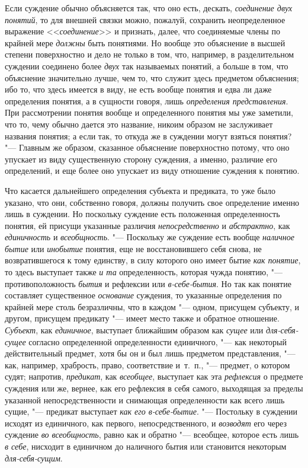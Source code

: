 {Если суждение обычно объясняется так, что оно есть, дескать,
{\em соединение двух понятий},
то для внешней связки можно, пожалуй, сохранить
неопределенное выражение
<<{\em соединение}>> и
признать, далее, что соединяемые члены по крайней мере
{\em должны} быть
понятиями. Но вообще это объяснение в высшей степени поверхностно и дело не
только в том, что, например, в разделительном суждении соединено более
{\em двух} так называемых
понятий, а больше в том, что объяснение значительно лучше, чем то, что
служит здесь предметом объяснения; ибо то, что здесь имеется в виду, не
есть вообще понятия и едва ли даже определения понятия, а в сущности
говоря, лишь {\em определения
представления}. При рассмотрении понятия вообще и
определенного понятия мы уже заметили, что то, чему обычно дается это
название, никоим образом не заслуживает названия понятия; а если так, то
откуда же в суждении могут взяться понятия? "--- Главным же
образом, сказанное объяснение поверхностно потому, что оно упускает из виду
существенную сторону суждения, а именно, различие его определений, и еще
более оно упускает из виду отношение суждения к понятию.

Что касается дальнейшего определения субъекта и предиката, то
уже было указано, что они, собственно говоря, должны получить свое
определение именно лишь в суждении. Но поскольку суждение есть положенная
определенность понятия, ей присущи указанные различия
{\em непосредственно} и
{\em абстрактно}, как
{\em единичность} и
{\em всеобщность}. "---
Поскольку же суждение есть вообще
{\em наличное бытие} или
{\em инобытие} понятия,
еще не восстановившего себя снова, не возвратившегося к тому единству, в
силу которого оно имеет бытие {\em как
понятие}, то здесь выступает также
{\em и та}
определенность, которая чужда понятию, "---
противоположность
{\em бытия} и рефлексии
или {\em в-себе-бытия}.
Но так как понятие составляет существенное
{\em основание} суждения,
то указанные определения по крайней мере столь безразличны, что в каждом
"--- одном, присущем субъекту, и другом, присущем предикату
"--- имеет место также и обратное отношение.
{\em Субъект}, как
{\em единичное},
выступает ближайшим образом как
{\em сущее} или
{\em для-себя-сущее}
согласно определенной определенности единичного, "---
как некоторый действительный предмет, хотя бы он и был лишь
предметом представления, "--- как, например, храбрость, право,
соответствие и~т.~п., "--- предмет, о котором судят; напротив,
{\em предикат}, как
{\em всеобщее}, выступает
как эта {\em рефлексия} о
предмете суждения или же, вернее, как его рефлексия в себя самого,
выходящая за пределы указанной непосредственности и снимающая
определенности как всего лишь сущие, "--- предикат выступает
{\em как его в-себе-бытие}. "---
Постольку в суждении исходят из единичного, как первого,
непосредственного, и {\em возводят}
его через суждение {\em во
всеобщность}, равно как и обратно "--- всеобщее,
которое есть лишь {\em в себе},
нисходит в единичном до наличного бытия или становится
некоторым {\em для-себя-сущим}.

}
